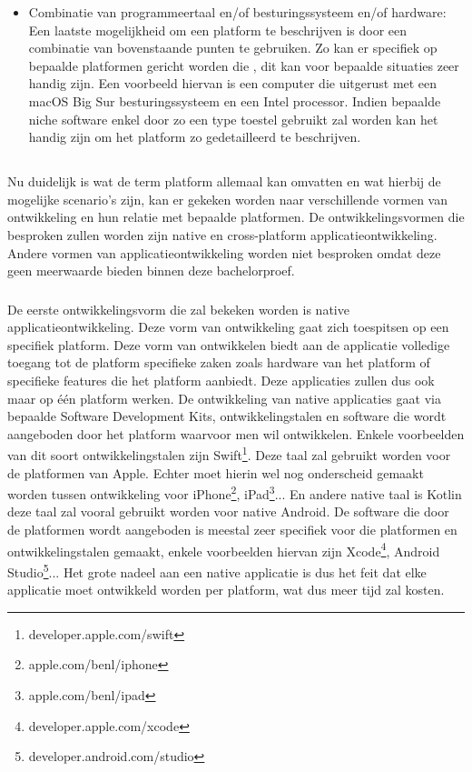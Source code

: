 \begin{itemize}
\item Combinatie van programmeertaal en/of besturingssysteem en/of hardware: \\
Een laatste mogelijkheid om een platform te beschrijven is door een combinatie van bovenstaande punten te gebruiken. Zo kan er specifiek op bepaalde platformen gericht worden die , dit kan voor bepaalde situaties zeer handig zijn. Een voorbeeld hiervan is een computer die uitgerust met een macOS Big Sur besturingssysteem en een Intel processor. Indien bepaalde niche software enkel door zo een type toestel gebruikt zal worden kan het handig zijn om het platform zo gedetailleerd te beschrijven.
\end{itemize}

\subsection{}
\label{sec:SVZontwikkelingsvormen}

Nu duidelijk is wat de term platform allemaal kan omvatten en wat hierbij de mogelijke scenario's zijn, kan er gekeken worden naar verschillende vormen van ontwikkeling en hun relatie met bepaalde platformen. De ontwikkelingsvormen die besproken zullen worden zijn native en cross-platform applicatieontwikkeling. Andere vormen van applicatieontwikkeling worden niet besproken omdat deze geen meerwaarde bieden binnen deze bachelorproef.

\subsubsection{}
\label{sec:SVZnative}
De eerste ontwikkelingsvorm die zal bekeken worden is native applicatieontwikkeling. Deze vorm van ontwikkeling gaat zich toespitsen op een specifiek platform. Deze vorm van ontwikkelen biedt aan de applicatie volledige toegang tot de platform specifieke zaken zoals hardware van het platform of specifieke features die het platform aanbiedt.\autocite{RahulRaj2012} Deze applicaties zullen dus ook maar op één platform werken. De ontwikkeling van native applicaties gaat via bepaalde Software Development Kits, ontwikkelingstalen en software die wordt aangeboden door het platform waarvoor men wil ontwikkelen.\autocite{Lim2015} Enkele voorbeelden van dit soort ontwikkelingstalen zijn Swift\footnote{developer.apple.com/swift}. Deze taal zal gebruikt worden voor de platformen van Apple. Echter moet hierin wel nog onderscheid gemaakt worden tussen ontwikkeling voor iPhone\footnote{apple.com/benl/iphone}, iPad\footnote{apple.com/benl/ipad}... En andere native taal is Kotlin deze taal zal vooral gebruikt worden voor native Android. De software die door de platformen wordt aangeboden is meestal zeer specifiek voor die platformen en ontwikkelingstalen gemaakt, enkele voorbeelden hiervan zijn Xcode\footnote{developer.apple.com/xcode}, Android Studio\footnote{developer.android.com/studio}... Het grote nadeel aan een native applicatie is dus het feit dat elke applicatie moet ontwikkeld worden per platform, wat dus meer tijd zal kosten.


